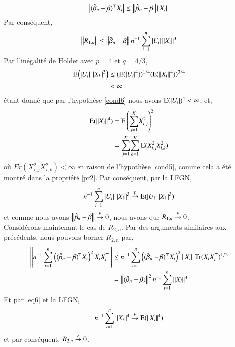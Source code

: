 \documentclass[10pt, reqno]{amsart}
\begin{document}
\begin{align*}
\left\vert {(\hat{\beta}_n- \beta)^\top X_i} \right\vert \leq \left\Vert {\hat{\beta}_n- \beta} \right\Vert\left\Vert {X_i} \right\Vert
\end{align*}
Par conséquent,
\begin{align*}
\left\Vert {R_{1,n}} \right\Vert \leq \left\Vert {\hat{\beta}_n- \beta} \right\Vert n^{-1} \sum_{i=1}^n \left\vert {U_i} \right\vert\left\Vert {X_i} \right\Vert^3
\end{align*}
Par l'inégalité de Holder avec $p=4$ et $q=4/3$,
\begin{align*}
\operatorname{E}\left(\left\vert {U_i} \right\vert\left\Vert {X_i} \right\Vert^3\right)&\leq (\operatorname{E}(\left\vert {U_i} \right\vert^4))^{1/4}(\operatorname{E}(\left\Vert {X_i} \right\Vert^4))^{3/4}\\
&< \infty
\end{align*}
étant donné que par l'hypothèse \ref{cond6} nous avons $\operatorname{E}(\left\vert {U_i} \right\vert)^4<\infty$, et,
\begin{align}
\operatorname{E}(\left\Vert {X_i} \right\Vert^4) &= \operatorname{E}\left(\underset{j=1}{\overset{K}{\sum}}X_{i, j}^2\right)^2\nonumber\\
&= \underset{j=1}{\overset{K}{\sum}}\underset{k=1}{\overset{K}{\sum}}\operatorname{E}(X_{i, j}^2X_{i, k}^2)
\label{eq6}
\end{align}
où $Er(X_{i, j}^2X_{i, k}^2) < \infty$ en raison de l'hypothèse \ref{cond5}, comme cela a été montré dans la propriété \ref{pr2}. Par conséquent, par la LFGN,
\begin{align*}
n^{-1} \sum_{i=1}^n \left\vert {U_i} \right\vert\left\Vert {X_i} \right\Vert^3 \overset{p}{\rightarrow} \operatorname{E}(\left\vert {U_i} \right\vert\left\Vert {X_i} \right\Vert^3)
\end{align*}
et comme nous avons $\left\Vert {\hat{\beta}_n- \beta} \right\Vert \overset{p}{\rightarrow} 0$, nous avons que $R_{1,n} \overset{p}{\rightarrow} 0$.\\
Considérons maintenant le cas de $R_{2,n}$. Par des arguments similaires aux précédents, nous pouvons borner $R_{2,n}$ par,
\begin{align*}
\left\Vert {n^{-1} \sum_{i=1}^n\left((\hat{\beta}_n-\beta)^\top X_i\right)^2 X_iX_i^\top} \right\Vert &\leq
n^{-1}\sum_{i=1}^n  \left((\hat{\beta}_n-\beta)^\top X_i\right)^2 \left\Vert {X_i} \right\Vert\operatorname{Tr}(X_iX_i^\top)^{1/2}\\
&= \left\Vert {(\hat{\beta}_n-\beta)} \right\Vert^2n^{-1} \sum_{i=1}^n\left\Vert {X_i} \right\Vert^4
\end{align*}
Et par \eqref{eq6} et la LFGN,
\begin{align*}
n^{-1} \sum_{i=1}^n\left\Vert {X_i} \right\Vert^4 \overset{p}{\rightarrow} \operatorname{E}(\left\Vert {X_i} \right\Vert^4)
\end{align*}
et par conséquent, $R_{2,n} \overset{p}{\rightarrow} 0$.



 
\end{document}
